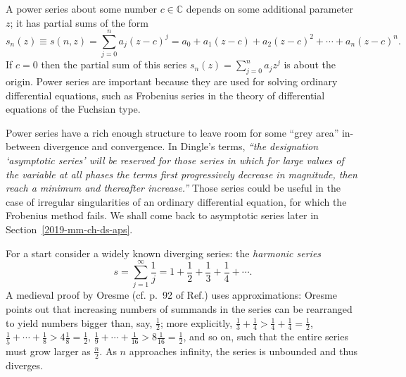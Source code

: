 A power series about some number $c\in \mathbb{C}$
depends on some additional parameter $z$; it has partial sums of the form
\begin{equation}
s_n (z)\equiv s(n,z) =
\sum_{j=0}^n a_j (z - c)^j =a_0+a_1 (z-c) +a_2(z-c)^2+\cdots + a_n (z-c)^n.
\end{equation}
If $c=0$ then the partial sum of this series  $s_n (z) =  \sum_{j=0}^n a_j z^j$
is about the origin.
Power series are important because they are used for solving ordinary differential equations,
such as Frobenius series  in the theory of
differential equations of the Fuchsian type.

Power series have a rich enough structure to leave room
for some ``grey area'' in-between divergence and convergence.
In Dingle's terms,\cite{Dingle-1973}
{\em
``the designation `asymptotic series' will be reserved
for those series in which for large values of the variable at all phases
the terms first progressively decrease in magnitude, then reach a minimum
and thereafter increase.''}
Those series could be useful in the case of irregular singularities
of an ordinary differential equation, for which the Frobenius method fails.
We shall come back to asymptotic series later in Section~\ref{2019-mm-ch-ds-aps}.


For a start consider a widely known diverging series: the
{\em harmonic series}
\begin{equation}
s=  \sum_{j=1}^\infty \frac{1}{j} = 1+\frac{1}{2}+\frac{1}{3}+\frac{1}{4}+\cdots .
\end{equation}
A medieval proof by Oresme (cf. p.~92 of Ref.\cite[10mm]{Edwards-1979})
uses approximations: Oresme points out that increasing numbers of summands in the series can be rearranged to yield numbers bigger than, say, $\frac{1}{2}$;
more explicitly,
$\frac{1}{3}+\frac{1}{4}> \frac{1}{4}+\frac{1}{4}  =\frac{1}{2}$,
$\frac{1}{5}+ \cdots +\frac{1}{8} > 4 \frac{1}{8}  =\frac{1}{2}$,
$\frac{1}{9}+ \cdots +\frac{1}{16} > 8 \frac{1}{16}  =\frac{1}{2}$,
and so on, such that the entire series must grow larger as $\frac{n}{2}$.
As $n$ approaches infinity, the series is unbounded and thus diverges.




